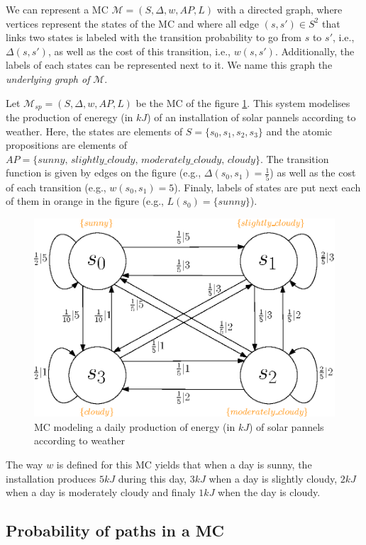 We can represent a MC $\mathcal{M} = (S, \Delta, w, AP, L)$ with a directed graph, where vertices represent the states
of the MC and where all edge $(s, s') \in S^2$ that links two states is labeled with the transition probability to go from $s$ to $s'$, i.e., $\Delta(s, s')$, as well as the cost of this transition, i.e., $w(s, s')$. Additionally, the labels of each
states can be represented next to it. We name this graph the \textit{underlying graph of} $\mathcal{M}$.

\begin{example}\label{solar-pannel}
  Let $\mathcal{M}_{sp} = (S, \Delta, w, AP, L)$ be the MC of the figure \ref{MCexample}. This system modelises the production of eneregy (in $kJ$) of
  an installation of solar pannels according to weather.
  Here, the states are elements of $S = \{s_0, s_1, s_2, s_3\}$ and the atomic propositions are elements of $AP = \{sunny, \, slightly\_cloudy, \, moderately\_cloudy, \, cloudy \}$. The transition function is given by edges on the figure (e.g., $\Delta(s_0, s_1) = \frac{1}{5}$) as well as the
  cost of each transition (e.g., $w(s_0, s_1) = 5$). Finaly, labels of states
  are put next each of them in orange in the figure (e.g., $L(s_0) = \{sunny\}$).
  \begin{figure}[h!]
    \centering
    \includegraphics[width=0.6\linewidth]{resources/weather-solar-pannel}
    \caption{MC modeling a daily production of energy (in $kJ$) of solar pannels according to weather}
    \label{MCexample}
  \end{figure}
  The way $w$ is defined for this MC yields that when a day is sunny, the installation produces $5 kJ$ during this day, $3 kJ$ when a day is slightly cloudy, $2 kJ$ when a day is moderately cloudy and finaly $1 kJ$ when the day is cloudy.
\end{example}

\subsection{Probability of paths in a MC}

